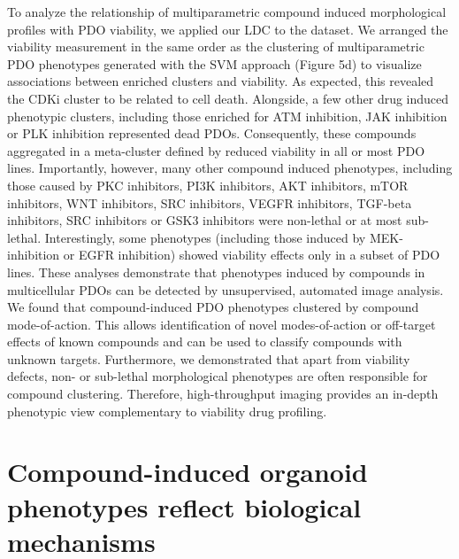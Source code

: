 To analyze the relationship of multiparametric compound induced morphological profiles with PDO viability, we applied our LDC to the dataset. We arranged the viability measurement in the same order as the clustering of multiparametric PDO phenotypes generated with the SVM approach (Figure 5d) to visualize associations between enriched clusters and viability. As expected, this revealed the CDKi cluster to be related to cell death. Alongside, a few other drug induced phenotypic clusters, including those enriched for ATM inhibition, JAK inhibition or PLK inhibition represented dead PDOs. Consequently, these compounds aggregated in a meta-cluster defined by reduced viability in all or most PDO lines. Importantly, however, many other compound induced phenotypes, including those caused by PKC inhibitors, PI3K inhibitors, AKT inhibitors, mTOR inhibitors, WNT inhibitors, SRC inhibitors, VEGFR inhibitors, TGF-beta inhibitors, SRC inhibitors or GSK3 inhibitors were non-lethal or at most sub-lethal. Interestingly, some phenotypes (including those induced by MEK-inhibition or EGFR inhibition) showed viability effects only in a subset of PDO lines.
These analyses demonstrate that phenotypes induced by compounds in multicellular PDOs can be detected by unsupervised, automated image analysis. We found that compound-induced PDO phenotypes clustered by compound mode-of-action. This allows identification of novel modes-of-action or off-target effects of known compounds and can be used to classify compounds with unknown targets. Furthermore, we demonstrated that apart from viability defects, non- or sub-lethal morphological phenotypes are often responsible for compound clustering. Therefore, high-throughput imaging provides an in-depth phenotypic view complementary to viability drug profiling.

\section{Compound-induced organoid phenotypes reflect biological mechanisms}

